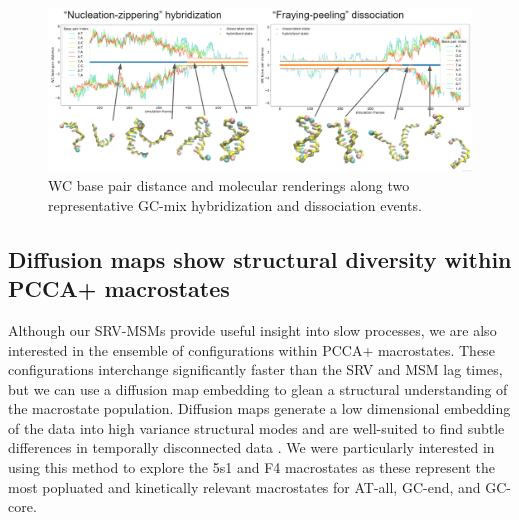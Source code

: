 \documentclass[journal=jpcbfk,manuscript=article]{achemso}
\begin{document}
\begin{figure} %
	\begin{center}
        \includegraphics[width=\textwidth]{Figs/figs_imp/GC-mix_transitions.PNG}
        \caption{WC base pair distance and molecular renderings along two representative GC-mix hybridization and dissociation events.}
        \label{fig:GC-mix_transitions}
	\end{center}
\end{figure}


\subsection{Diffusion maps show structural diversity within PCCA+ macrostates}

Although our SRV-MSMs provide useful insight into slow processes, we are also interested in the ensemble of configurations within PCCA+ macrostates. These configurations interchange significantly faster than the SRV and MSM lag times, but we can use a diffusion map embedding to glean a structural understanding of the macrostate population. Diffusion maps generate a low dimensional embedding of the data into high variance structural modes and are well-suited to find subtle differences in temporally disconnected data \citep{Coifman2006DiffusionMaps, Ferguson2010SystematicMaps}. We were particularly interested in using this method to explore the 5s1 and F4 macrostates as these represent the most popluated and kinetically relevant macrostates for AT-all, GC-end, and GC-core.

\end{document}
